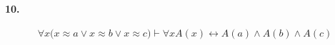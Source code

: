 \documentclass[]{exam}
\begin{document}
\paragraph[10.1]{10.}

$$\forall x \biggl( x \approx a \vee x \approx b \vee x \approx c \biggr)
\vdash \forall x A(x) \longleftrightarrow A(a) \wedge A(b) \wedge A(c)$$
\end{document}
